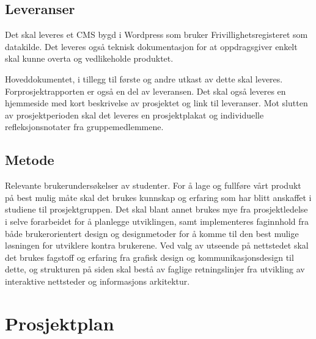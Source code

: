\documentclass[11pt,a4paper]{report}
\begin{document}
\subsection*{Leveranser}

Det skal leveres et CMS bygd i Wordpress som bruker Frivillighetsregisteret som datakilde. Det leveres også teknisk dokumentasjon for at oppdragsgiver enkelt skal kunne overta og vedlikeholde produktet.

Hoveddokumentet, i tillegg til første og andre utkast av dette skal leveres. Forprosjektrapporten er også en del av leveransen. Det skal også leveres en hjemmeside med kort beskrivelse av prosjektet og link til leveranser. Mot slutten av prosjektperioden skal det leveres en prosjektplakat og individuelle refleksjonsnotater fra gruppemedlemmene.

\subsection*{Metode}
Relevante brukerundersøkelser av studenter. For å lage og fullføre vårt produkt på best mulig måte skal det brukes kunnskap og erfaring som har blitt anskaffet i studiene til prosjektgruppen. Det skal blant annet brukes mye fra prosjektledelse i selve forarbeidet for å planlegge utviklingen, samt implementeres faginnhold fra både brukerorientert design og designmetoder for å komme til den best mulige løsningen for utviklere kontra brukerene. Ved valg av utseende på nettstedet skal det brukes fagstoff og erfaring fra grafisk design og kommunikasjonsdesign til dette, og strukturen på siden skal bestå av faglige retningslinjer fra utvikling av interaktive nettsteder og informasjons arkitektur.


\section*{Prosjektplan}
\end{document}
